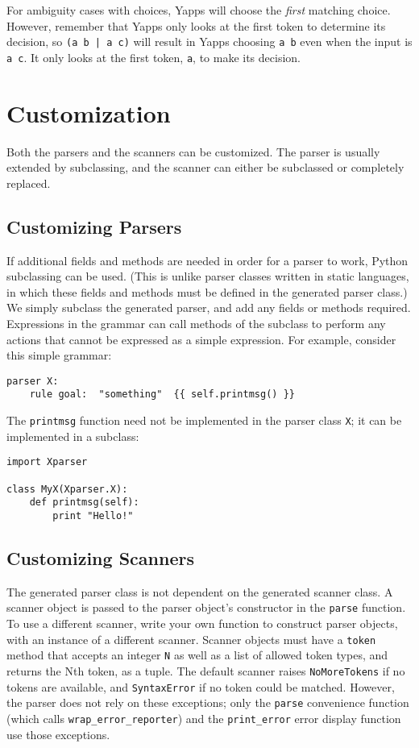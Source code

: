 \documentclass[10pt]{article}
\newcommand{\mysection}[1]{\section{#1}}
\newcommand{\mysubsection}[1]{\subsection{#1}}
\begin{document}
For ambiguity cases with choices, Yapps will choose the \emph{first}
matching choice.  However, remember that Yapps only looks at the first 
token to determine its decision, so {\tt (a b | a c)} will result in
Yapps choosing {\tt a b} even when the input is {\tt a c}.  It only
looks at the first token, {\tt a}, to make its decision.

\mysection{Customization}

Both the parsers and the scanners can be customized.  The parser is
usually extended by subclassing, and the scanner can either be
subclassed or completely replaced.

\mysubsection{Customizing Parsers}

If additional fields and methods are needed in order for a parser to
work, Python subclassing can be used.  (This is unlike parser classes
written in static languages, in which these fields and methods must be
defined in the generated parser class.)  We simply subclass the
generated parser, and add any fields or methods required.  Expressions
in the grammar can call methods of the subclass to perform any actions
that cannot be expressed as a simple expression.  For example,
consider this simple grammar:

\begin{verbatim}
parser X:
    rule goal:  "something"  {{ self.printmsg() }}
\end{verbatim}

The \texttt{printmsg} function need not be implemented in the parser
class \texttt{X}; it can be implemented in a subclass:

\begin{verbatim}
import Xparser

class MyX(Xparser.X):
    def printmsg(self):
        print "Hello!"
\end{verbatim}

\mysubsection{Customizing Scanners}

The generated parser class is not dependent on the generated scanner
class.  A scanner object is passed to the parser object's constructor
in the \texttt{parse} function.  To use a different scanner, write
your own function to construct parser objects, with an instance of a
different scanner.  Scanner objects must have a \texttt{token} method
that accepts an integer \texttt{N} as well as a list of allowed token
types, and returns the Nth token, as a tuple.  The default scanner
raises \texttt{NoMoreTokens} if no tokens are available, and
\texttt{SyntaxError} if no token could be matched.  However, the
parser does not rely on these exceptions; only the \texttt{parse}
convenience function (which calls \texttt{wrap\_error\_reporter}) and
the \texttt{print\_error} error display function use those exceptions.
\end{document}
